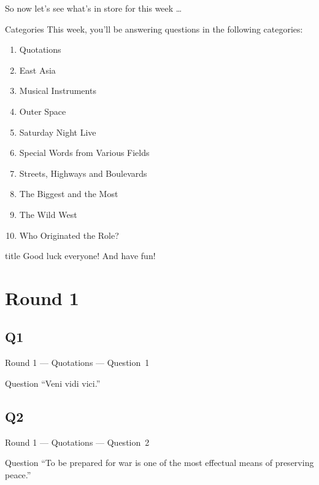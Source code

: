 \documentclass[11pt]{beamer}
\begin{document}
\begin{frame}{}
\medskip{}
So now let's see what's in store for this week \ldots{}
\end{frame}


\begingroup{}
\begin{frame}[t]{Categories}
This week, you'll be answering questions in the following categories:
\begin{enumerate}
\item Quotations
\item East Asia
\item Musical Instruments
\item Outer Space
\item Saturday Night Live
\item Special Words from Various Fields
\item Streets, Highways and Boulevards
\item The Biggest and the Most
\item The Wild West
\item Who Originated the Role?
\end{enumerate}
\end{frame}
\endgroup{}

\begingroup{}
\begin{frame}
\vfill{}
\begin{beamercolorbox}[sep=8pt,center,shadow=true,rounded=true]{title}
Good luck everyone! And have fun!
\end{beamercolorbox}
\vfill{}
\end{frame}
\endgroup{}
\def\thisSectionName{Quotations}
\section{Round 1}
\subsection*{Q1}
\begin{frame}[t]{Round 1 --- Quotations --- \mbox{Question 1}}
\vspace{-0.5em}
\begin{block}{Question}
``Veni vidi vici.''
\end{block}
\end{frame}
\subsection*{Q2}
\begin{frame}[t]{Round 1 --- Quotations --- \mbox{Question 2}}
\vspace{-0.5em}
\begin{block}{Question}
``To be prepared for war is one of the most effectual means of preserving peace.''
\end{block}
\end{frame}
\end{document}
